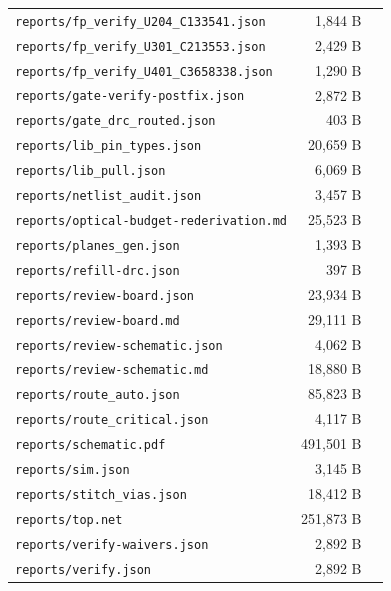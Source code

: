 \documentclass[11pt,a4paper]{article}
\begin{document}
{\begin{longtable}{p{9cm}rp{4cm}}
\texttt{reports/fp\_verify\_U204\_C133541.json} & 1,844 B &  \\
\texttt{reports/fp\_verify\_U301\_C213553.json} & 2,429 B &  \\
\texttt{reports/fp\_verify\_U401\_C3658338.json} & 1,290 B &  \\
\texttt{reports/gate-verify-postfix.json} & 2,872 B &  \\
\texttt{reports/gate\_drc\_routed.json} & 403 B &  \\
\texttt{reports/lib\_pin\_types.json} & 20,659 B &  \\
\texttt{reports/lib\_pull.json} & 6,069 B &  \\
\texttt{reports/netlist\_audit.json} & 3,457 B &  \\
\texttt{reports/optical-budget-rederivation.md} & 25,523 B &  \\
\texttt{reports/planes\_gen.json} & 1,393 B &  \\
\texttt{reports/refill-drc.json} & 397 B &  \\
\texttt{reports/review-board.json} & 23,934 B &  \\
\texttt{reports/review-board.md} & 29,111 B &  \\
\texttt{reports/review-schematic.json} & 4,062 B &  \\
\texttt{reports/review-schematic.md} & 18,880 B &  \\
\texttt{reports/route\_auto.json} & 85,823 B &  \\
\texttt{reports/route\_critical.json} & 4,117 B &  \\
\texttt{reports/schematic.pdf} & 491,501 B &  \\
\texttt{reports/sim.json} & 3,145 B &  \\
\texttt{reports/stitch\_vias.json} & 18,412 B &  \\
\texttt{reports/top.net} & 251,873 B &  \\
\texttt{reports/verify-waivers.json} & 2,892 B &  \\
\texttt{reports/verify.json} & 2,892 B &  \\
\bottomrule
\end{longtable}
}
\end{document}
